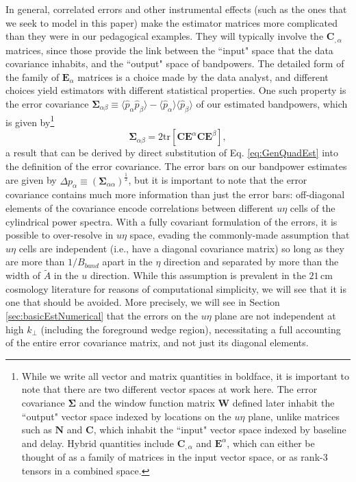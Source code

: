 \documentclass[twocolumn,aps,prd,nofootinbib,showpacs]{revtex4-1}
\begin{document}
In general, correlated errors and other instrumental effects (such as the ones that we seek to model in this paper) make the estimator matrices more complicated than they were in our pedagogical examples.  They will typically involve the $\mathbf{C}_{,\alpha}$ matrices, since those provide the link between the ``input" space that the data covariance inhabits, and the ``output" space of bandpowers.  The detailed form of the family of $\mathbf{E}_\alpha$ matrices is a choice made by the data analyst, and different choices yield estimators with different statistical properties.  One such property is the error covariance $\boldsymbol \Sigma_{\alpha \beta} \equiv \langle \widehat{p}_\alpha \widehat{p}_\beta \rangle - \langle \widehat{p}_\alpha \rangle \langle \widehat{p}_\beta \rangle $ of our estimated bandpowers, which is given by\footnote{While we write all vector and matrix quantities in boldface, it is important to note that there are two different vector spaces at work here.  The error covariance $\boldsymbol \Sigma$ and the window function matrix $\mathbf{W}$ defined later inhabit the ``output" vector space indexed by locations on the $u\eta$ plane, unlike matrices such as $\mathbf{N}$ and $\mathbf{C}$, which inhabit the ``input" vector space indexed by baseline and delay.  Hybrid quantities include $\mathbf{C}_{,\alpha}$ and $\mathbf{E}^\alpha$, which can either be thought of as a family of matrices in the input vector space, or as rank-3 tensors in a combined space.}
\begin{equation}
\label{eq:matrixErrorCovar}
\boldsymbol \Sigma_{\alpha \beta} = 2 \textrm{tr} \left[ \mathbf{C} \mathbf{E}^\alpha \mathbf{C} \mathbf{E}^\beta \right],
\end{equation}
a result that can be derived by direct substitution of  Eq. \eqref{eq:GenQuadEst} into the definition of the error covariance.  The error bars on our bandpower estimates are given by $\Delta p_\alpha \equiv (\boldsymbol \Sigma_{\alpha \alpha})^{\frac{1}{2}}$, but it is important to note that the error covariance contains much more information than just the error bars: off-diagonal elements of the covariance encode correlations between different $u\eta$ cells of the cylindrical power spectra.  With a fully covariant formulation of the errors, it is possible to over-resolve in $u\eta$ space, evading the commonly-made assumption that $u\eta$ cells are independent (i.e., have a diagonal covariance matrix) so long as they are more than $1/B_{band}$ apart in the $\eta$ direction and separated by more than the width of $\widetilde{A}$ in the $u$ direction.  While this assumption is prevalent in the $21\,\textrm{cm}$ cosmology literature for reasons of computational simplicity, we will see that it is one that should be avoided.  More precisely, we will see in Section \ref{sec:basicEstNumerical} that the errors on the $u\eta$ plane are not independent at high $k_\perp$ (including the foreground wedge region), necessitating a full accounting of the entire error covariance matrix, and not just its diagonal elements.
\end{document}
